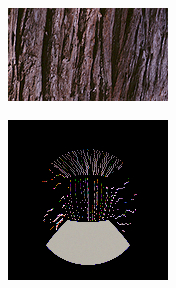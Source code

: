 \begin{figure}[]
\begin{subfigure}{\textwidth}
        \begin{subfigure}{0.19\textwidth}
            \centering
            \includegraphics[width=\textwidth]{images/04-experiment03/ball_wood_target.jpg}
            \caption*{}
        \end{subfigure}
        \hfill
        \begin{subfigure}{0.19\textwidth}
            \centering
            \includegraphics[width=\textwidth]{images/04-experiment03/ball/wood/stats_im.jpg}
            \caption*{}
        \end{subfigure}
        \hfill
        \begin{subfigure}{0.19\textwidth}

\end{subfigure}
\end{subfigure}
\end{figure}
